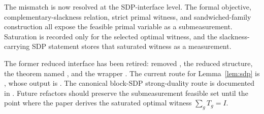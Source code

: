 \documentclass[11pt]{article}
\begin{document}
The mismatch is now resolved at the SDP-interface level. The formal objective,
complementary-slackness relation, strict primal witness, and sandwiched-family
construction all expose the feasible primal variable as a submeasurement.
Saturation is recorded only for the selected optimal witness, and the
slackness-carrying SDP statement stores that saturated witness as a measurement.

The former reduced interface has been retired:  removed
, the reduced  structure, the theorem
named , and the wrapper . The
current \Lean{} route for Lemma~\ref{lem:sdp} is
, whose output is
.  The canonical block-SDP strong-duality route
is documented in
. Future
refactors should preserve the submeasurement feasible set until the point where
the paper derives the saturated optimal witness $\sum_g T_g=I$.



\end{document}
